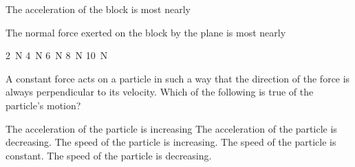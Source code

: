 \documentclass{../../../oss-classkick-exam}
\begin{document}
\begin{multicols*}{2}
\begin{questions}
    
    \question The acceleration of the block is most nearly
    \label{plane1}
    
    \question The normal force exerted on the block by the plane is most nearly
    \begin{choices}
      \choice\SI{2}{\newton}
      \choice\SI{4}{\newton}
      \choice\SI{6}{\newton}
      \choice\SI{8}{\newton}
      \choice\SI{10}{\newton}
    \end{choices}
    \label{plane2}
   
    \question A constant force acts on a particle in such a way that the
    direction of the force is always perpendicular to its velocity. Which of the
    following is true of the particle's motion?
    \begin{choices}
      \choice The acceleration of the particle is increasing
      \choice The acceleration of the particle is decreasing.
      \choice The speed of the particle is increasing.
      \choice The speed of the particle is constant.
      \choice The speed of the particle is decreasing.
    \end{choices}
    \vspace{.7in}


\end{questions}
\end{multicols*}
\end{document}
